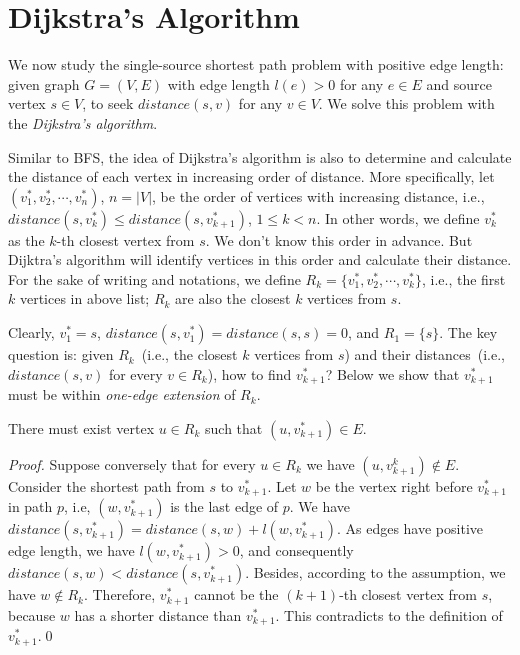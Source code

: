 \setcounter{definition}{0} \setcounter{property}{0} \setcounter{claim}{0} \setcounter{fact}{0} \setcounter{corollary}{0} \setcounter{figure}{0}
\section{Dijkstra's Algorithm}

We now study the single-source shortest path problem with positive edge length:
given graph $G = (V, E)$ with edge length $l(e) > 0$ for any $e\in E$ and
source vertex $s\in V$, to seek $distance(s, v)$ for any $v\in V$.
We solve this problem with the \emph{Dijkstra's algorithm}.

Similar to BFS, the idea of Dijkstra's algorithm is also to
determine and calculate the distance of each vertex
in increasing order of distance.
More specifically, let $(v_1^*, v_2^*, \cdots, v_n^*)$, $n = |V|$,
be the order of vertices with increasing distance, i.e., $distance(s, v_k^*) \le distance(s, v_{k+1}^*)$, $1\le k < n$.
In other words, we define $v_k^*$ as the $k$-th closest vertex from $s$.
We don't know this order in advance.
But Dijktra's algorithm will identify vertices in this order and calculate
their distance.
For the sake of writing and notations, we define $R_k = \{v_1^*, v_2^*, \cdots, v_k^*\}$, i.e., 
the first $k$ vertices in above list; $R_k$ are also the closest $k$ vertices from $s$.

Clearly, $v_1^* = s$, $distance(s, v_1^*) = distance(s, s) = 0$, and $R_1 = \{s\}$.
The key question is: given $R_k$~(i.e., the closest $k$ vertices from $s$) and their distances~(i.e., $distance(s, v)$ for every $v\in R_k$),
how to find $v_{k + 1}^*$?
Below we show that $v_{k + 1}^*$ must be within \emph{one-edge extension} of $R_k$.
\begin{claim}
There must exist vertex $u\in R_k$ such that $(u, v_{k+1}^*) \in E$.
\end{claim}
\emph{Proof.} Suppose conversely that for every $u\in R_k$ we have $(u, v_{k+1}^k)\not\in E$.
Consider the shortest path from $s$ to $v_{k+1}^*$.
Let $w$ be the vertex right before $v_{k+1}^*$ in path $p$, i.e, $(w, v_{k+1}^*)$ is the last edge of $p$.
We have $distance(s, v_{k+1}^*) = distance(s, w) + l(w, v_{k+1}^*)$. %
As edges have positive edge length, we have $l(w, v_{k+1}^*) > 0$, and consequently
$distance(s, w) < distance(s, v_{k+1}^*)$.
Besides, according to the assumption, we have $w\not\in R_k$.
Therefore, $v_{k+1}^*$ cannot be the $(k+1)$-th closest vertex from $s$,
because $w$ has a shorter distance than $v_{k+1}^*$. This contradicts to the definition of $v_{k+1}^*$.\qed


